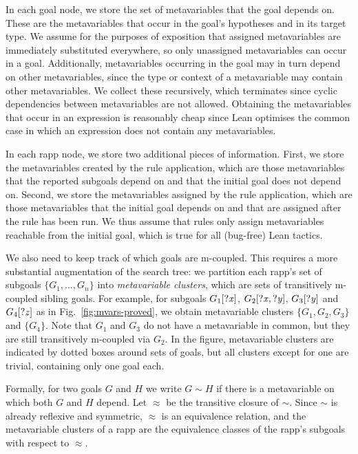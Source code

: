 In each goal node, we store the set of metavariables that the goal depends on.
These are the metavariables that occur in the goal's hypotheses and in its target type.
We assume for the purposes of exposition that assigned metavariables are immediately substituted everywhere, so only unassigned metavariables can occur in a goal.
Additionally, metavariables occurring in the goal may in turn depend on other metavariables, since the type or context of a metavariable may contain other metavariables.
We collect these recursively, which terminates since cyclic dependencies between metavariables are not allowed.
Obtaining the metavariables that occur in an expression is reasonably cheap since Lean optimises the common case in which an expression does not contain any metavariables.

In each rapp node, we store two additional pieces of information.
First, we store the metavariables created by the rule application, which are those metavariables that the reported subgoals depend on and that the initial goal does not depend on.
Second, we store the metavariables assigned by the rule application, which are those metavariables that the initial goal depends on and that are assigned after the rule has been run.
We thus assume that rules only assign metavariables reachable from the initial goal, which is true for all (bug-free) Lean tactics.

We also need to keep track of which goals are m-coupled.
This requires a more substantial augmentation of the search tree: we partition each rapp's set of subgoals $\{ G_{1}, \dots, G_{n} \}$ into \emph{metavariable clusters}, which are sets of transitively m-coupled sibling goals.
For example, for subgoals $G_{1}[\mathit{?x}]$, $G_{2}[\mathit{?x}, \mathit{?y}]$, $G_{3}[\mathit{?y}]$ and $G_{4}[\mathit{?z}]$ as in Fig.~\ref{fig:mvars-proved}, we obtain metavariable clusters $\{ G_{1}, G_{2}, G_{3} \}$ and $\{ G_{4} \}$.
Note that $G_{1}$ and $G_{3}$ do not have a metavariable in common, but they are still transitively m-coupled via $G_{2}$.
In the figure, metavariable clusters are indicated by dotted boxes around sets of goals, but all clusters except for one are trivial, containing only one goal each.

Formally, for two goals $G$ and $H$ we write $G \sim H$ if there is a metavariable on which both $G$ and $H$ depend.
Let $\approx$ be the transitive closure of $\sim$.
Since $\sim$ is already reflexive and symmetric, $\approx$ is an equivalence relation, and the metavariable clusters of a rapp are the equivalence classes of the rapp's subgoals with respect to $\approx$.

